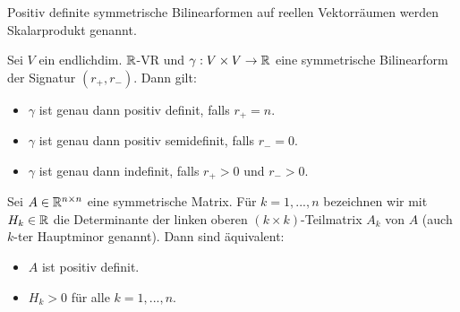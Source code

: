 \documentclass{cheat-sheet}
\begin{document}
\begin{bem}
Positiv definite symmetrische Bilinearformen auf reellen Vektorräumen werden Skalarprodukt genannt.
\end{bem}

\begin{satz}
Sei $V$ ein endlichdim. $\mathbb{R}$-VR und $\gamma : V \times V \to \mathbb{R}$ eine symmetrische Bilinearform der Signatur $(r_+, r_-)$. Dann gilt:
\begin{itemize}
  \item $\gamma$ ist genau dann positiv definit, falls $r_+ = n$.
  \item $\gamma$ ist genau dann positiv semidefinit, falls $r_- = 0$.
  \item $\gamma$ ist genau dann indefinit, falls $r_+ > 0$ und $r_- > 0$.
\end{itemize}
\end{satz}

\begin{satz}
Sei $A \in \mathbb{R}^{n \times n}$ eine symmetrische Matrix. Für $k = 1, ..., n$ bezeichnen wir mit $H_k \in \mathbb{R}$ die Determinante der linken oberen $(k \times k)$-Teilmatrix $A_k$ von $A$ (auch $k$-ter Hauptminor genannt). Dann sind äquivalent:
\begin{itemize}
  \item $A$ ist positiv definit.
  \item $H_k > 0$ für alle $k = 1, ..., n$.
\end{itemize}
\end{satz}
\end{document}
